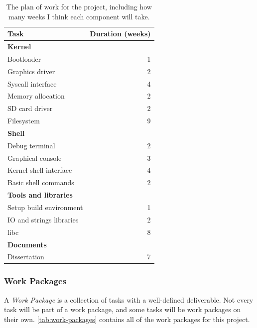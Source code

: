 \documentclass{article}
\begin{document}
\begin{table}[tbp]
\begin{center}
\begin{tabular}{|l|r|}
    \hline
    Task & Duration (weeks) \\
    \hline \textbf{Kernel} & \\
    Bootloader & 1 \\
    Graphics driver & 2 \\
    Syscall interface & 4 \\
    Memory allocation & 2 \\
    SD card driver & 2 \\
    Filesystem & 9 \\
    \hline \textbf{Shell} & \\
    Debug terminal & 2 \\
    Graphical console & 3 \\
    Kernel shell interface & 4 \\
    Basic shell commands & 2 \\
    \hline \textbf{Tools and libraries} & \\
    Setup build environment & 1 \\
    IO and strings libraries & 2 \\
    libc & 8 \\
    \hline \textbf{Documents} & \\
    Dissertation & 7 \\
    \hline
\end{tabular}
\caption{The plan of work for the project, including how many weeks I think
each component will take.}
\label{tab:work-plan}
\end{center}
\end{table}

\subsubsection{Work Packages}
\label{sec:work_packages}
A \emph{Work Package} is a collection of tasks with a well-defined deliverable.
Not every task will be part of a work package, and some tasks will be work
packages on their own. \autoref{tab:work-packages} contains all of the work
packages for this project.
\end{document}
